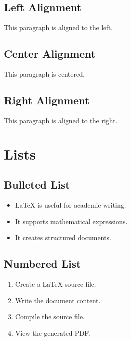 \documentclass[12pt,a4paper]{article}
\begin{document}
\subsection{Left Alignment}

\begin{flushleft}
This paragraph is aligned to the left.
\end{flushleft}

\subsection{Center Alignment}

\begin{center}
This paragraph is centered.
\end{center}

\subsection{Right Alignment}

\begin{flushright}
This paragraph is aligned to the right.
\end{flushright}

\section{Lists}

\subsection{Bulleted List}

\begin{itemize}
    \item LaTeX is useful for academic writing.
    \item It supports mathematical expressions.
    \item It creates structured documents.
\end{itemize}

\subsection{Numbered List}

\begin{enumerate}
    \item Create a LaTeX source file.
    \item Write the document content.
    \item Compile the source file.
    \item View the generated PDF.
\end{enumerate}
\end{document}
